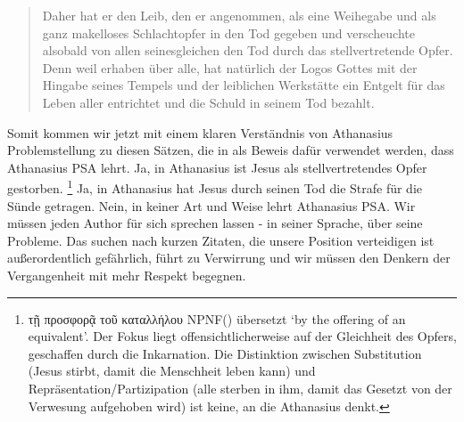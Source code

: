 \begin{quote}
	Daher hat er den Leib, den er angenommen,
als eine Weihegabe und als ganz makelloses Schlachtopfer in den Tod gegeben und verscheuchte alsobald von allen seinesgleichen den Tod durch
das stellvertretende Opfer.
Denn weil erhaben über alle, hat natürlich der Logos Gottes
mit der Hingabe seines Tempels und der leiblichen Werkstätte ein Entgelt für das Leben
aller entrichtet und die Schuld in seinem Tod bezahlt.
\end{quote}
Somit kommen wir jetzt mit einem klaren Verständnis von Athanasius Problemstellung zu diesen Sätzen, die in \Cite{psa-in-church-history} als Beweis dafür verwendet werden, dass Athanasius PSA lehrt.
Ja, in Athanasius ist Jesus als stellvertretendes Opfer gestorben.
\footnote{τῇ προσφορᾷ τοῦ καταλλήλου NPNF(\Cite{de-incarnatione-verbi-npnf}) übersetzt `by the offering of an equivalent'.
Der Fokus liegt offensichtlicherweise auf der Gleichheit des Opfers, geschaffen durch die Inkarnation.
Die Distinktion zwischen Substitution (Jesus stirbt, damit die Menschheit leben kann) und Repräsentation/Partizipation (alle sterben in ihm, damit das Gesetzt von der Verwesung aufgehoben wird) ist keine, an die Athanasius denkt.
}
Ja, in Athanasius hat Jesus durch seinen Tod die Strafe für die Sünde getragen.
Nein, in keiner Art und Weise lehrt Athanasius PSA.
Wir müssen jeden Author für sich sprechen lassen - in seiner Sprache, über seine Probleme.
Das suchen nach kurzen Zitaten, die unsere Position verteidigen ist außerordentlich gefährlich, führt zu Verwirrung und wir müssen den Denkern der Vergangenheit mit mehr Respekt begegnen.

